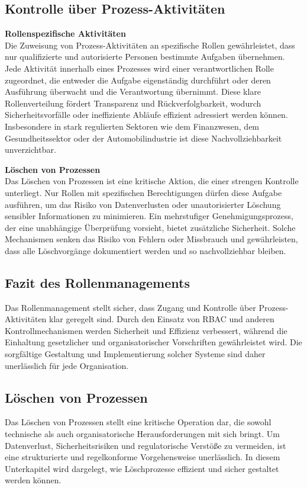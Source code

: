 \subsection*{Kontrolle über Prozess-Aktivitäten}
\textbf{Rollenspezifische Aktivitäten}\\
Die Zuweisung von Prozess-Aktivitäten an spezifische Rollen gewährleistet, dass nur qualifizierte und autorisierte Personen bestimmte Aufgaben übernehmen. Jede Aktivität innerhalb eines Prozesses wird einer verantwortlichen Rolle zugeordnet, die entweder die Aufgabe eigenständig durchführt oder deren Ausführung überwacht und die Verantwortung übernimmt.
Diese klare Rollenverteilung fördert Transparenz und Rückverfolgbarkeit, wodurch Sicherheitsvorfälle oder ineffiziente Abläufe effizient adressiert werden können. Insbesondere in stark regulierten Sektoren wie dem Finanzwesen, dem Gesundheitssektor oder der Automobilindustrie ist diese Nachvollziehbarkeit unverzichtbar.

\textbf{Löschen von Prozessen}\\
Das Löschen von Prozessen ist eine kritische Aktion, die einer strengen Kontrolle unterliegt. Nur Rollen mit spezifischen Berechtigungen dürfen diese Aufgabe ausführen, um das Risiko von Datenverlusten oder unautorisierter Löschung sensibler Informationen zu minimieren.
Ein mehrstufiger Genehmigungsprozess, der eine unabhängige Überprüfung vorsieht, bietet zusätzliche Sicherheit. Solche Mechanismen senken das Risiko von Fehlern oder Missbrauch und gewährleisten, dass alle Löschvorgänge dokumentiert werden und so nachvollziehbar bleiben.

\subsection*{Fazit des Rollenmanagements}
Das Rollenmanagement stellt sicher, dass Zugang und Kontrolle über Prozess-Aktivitäten klar geregelt sind. Durch den Einsatz von \ac{RBAC} und anderen Kontrollmechanismen werden Sicherheit und Effizienz verbessert, während die Einhaltung gesetzlicher und organisatorischer Vorschriften gewährleistet wird. Die sorgfältige Gestaltung und Implementierung solcher Systeme sind daher unerlässlich für jede Organisation.


\subsection{Löschen von Prozessen}
Das Löschen von Prozessen stellt eine kritische Operation dar, die sowohl technische als auch organisatorische Herausforderungen mit sich bringt. Um Datenverlust, Sicherheitsrisiken und regulatorische Verstöße zu vermeiden, ist eine strukturierte und regelkonforme Vorgehensweise unerlässlich. In diesem Unterkapitel wird dargelegt, wie Löschprozesse effizient und sicher gestaltet werden können.

